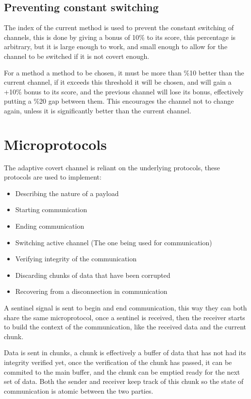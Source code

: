 \subsection{Preventing constant switching}

The index of the current method is used to prevent the constant switching of channels, this is done by giving a bonus of 10\% to its score, this percentage is arbitrary, but it is large enough to work, and small enough to allow for the channel to be switched if it is not covert enough.

For a method a method to be chosen, it must be more than \%10 better than the current channel, if it exceeds this threshold it will be chosen, and will gain a +10\% bonus to its score, and the previous channel will lose its bonus, effectively putting a \%20 gap between them. This encourages the channel not to change again, unless it is significantly better than the current channel.

\section{Microprotocols}
\label{sec:microprotocols}

The adaptive covert channel is reliant on the underlying protocols, these protocols are used to implement:
\begin{itemize}
    \item Describing the nature of a payload
    \item Starting communication
    \item Ending communication
    \item Switching active channel (The one being used for communication)
    \item Verifying integrity of the communication
    \item Discarding chunks of data that have been corrupted
    \item Recovering from a disconnection in communication
\end{itemize}
\label{itm:microprotocols}

A sentinel signal is sent to begin and end communication, this way they can both share the same microprotocol, once a sentinel is received, then the receiver starts to build the context of the communication, like the received data and the current chunk.

Data is sent in chunks, a chunk is effectively a buffer of data that has not had its integrity verified yet, once the verification of the chunk has passed, it can be commited to the main buffer, and the chunk can be emptied ready for the next set of data. Both the sender and receiver keep track of this chunk so the state of communication is atomic between the two parties.


